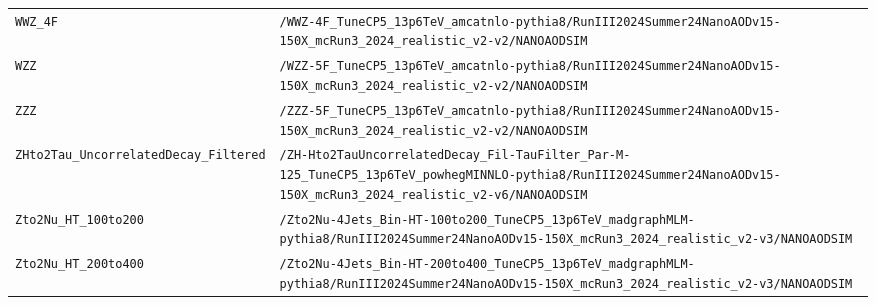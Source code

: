 \begin{longtable}{@{}>{\RaggedRight\arraybackslash}p{} >{\RaggedRight\arraybackslash}p{}@{}}
\addlinespace[2pt]
\texttt{WWZ\_\allowbreak{}4F} & \texttt{/\allowbreak{}WWZ-\allowbreak{}4F\_\allowbreak{}TuneCP5\_\allowbreak{}13p6TeV\_\allowbreak{}amcatnlo-\allowbreak{}pythia8/\allowbreak{}RunIII2024Summer24NanoAODv15-\allowbreak{}150X\_\allowbreak{}mcRun3\_\allowbreak{}2024\_\allowbreak{}realistic\_\allowbreak{}v2-\allowbreak{}v2/\allowbreak{}NANOAODSIM} \\
\addlinespace[2pt]
\texttt{WZZ} & \texttt{/\allowbreak{}WZZ-\allowbreak{}5F\_\allowbreak{}TuneCP5\_\allowbreak{}13p6TeV\_\allowbreak{}amcatnlo-\allowbreak{}pythia8/\allowbreak{}RunIII2024Summer24NanoAODv15-\allowbreak{}150X\_\allowbreak{}mcRun3\_\allowbreak{}2024\_\allowbreak{}realistic\_\allowbreak{}v2-\allowbreak{}v2/\allowbreak{}NANOAODSIM} \\
\addlinespace[2pt]
\texttt{ZZZ} & \texttt{/\allowbreak{}ZZZ-\allowbreak{}5F\_\allowbreak{}TuneCP5\_\allowbreak{}13p6TeV\_\allowbreak{}amcatnlo-\allowbreak{}pythia8/\allowbreak{}RunIII2024Summer24NanoAODv15-\allowbreak{}150X\_\allowbreak{}mcRun3\_\allowbreak{}2024\_\allowbreak{}realistic\_\allowbreak{}v2-\allowbreak{}v2/\allowbreak{}NANOAODSIM} \\
\addlinespace[2pt]
\texttt{ZHto2Tau\_\allowbreak{}UncorrelatedDecay\_\allowbreak{}Filtered} & \texttt{/\allowbreak{}ZH-\allowbreak{}Hto2TauUncorrelatedDecay\_\allowbreak{}Fil-\allowbreak{}TauFilter\_\allowbreak{}Par-\allowbreak{}M-\allowbreak{}125\_\allowbreak{}TuneCP5\_\allowbreak{}13p6TeV\_\allowbreak{}powhegMINNLO-\allowbreak{}pythia8/\allowbreak{}RunIII2024Summer24NanoAODv15-\allowbreak{}150X\_\allowbreak{}mcRun3\_\allowbreak{}2024\_\allowbreak{}realistic\_\allowbreak{}v2-\allowbreak{}v6/\allowbreak{}NANOAODSIM} \\
\addlinespace[2pt]
\texttt{Zto2Nu\_\allowbreak{}HT\_\allowbreak{}100to200} & \texttt{/\allowbreak{}Zto2Nu-\allowbreak{}4Jets\_\allowbreak{}Bin-\allowbreak{}HT-\allowbreak{}100to200\_\allowbreak{}TuneCP5\_\allowbreak{}13p6TeV\_\allowbreak{}madgraphMLM-\allowbreak{}pythia8/\allowbreak{}RunIII2024Summer24NanoAODv15-\allowbreak{}150X\_\allowbreak{}mcRun3\_\allowbreak{}2024\_\allowbreak{}realistic\_\allowbreak{}v2-\allowbreak{}v3/\allowbreak{}NANOAODSIM} \\
\addlinespace[2pt]
\texttt{Zto2Nu\_\allowbreak{}HT\_\allowbreak{}200to400} & \texttt{/\allowbreak{}Zto2Nu-\allowbreak{}4Jets\_\allowbreak{}Bin-\allowbreak{}HT-\allowbreak{}200to400\_\allowbreak{}TuneCP5\_\allowbreak{}13p6TeV\_\allowbreak{}madgraphMLM-\allowbreak{}pythia8/\allowbreak{}RunIII2024Summer24NanoAODv15-\allowbreak{}150X\_\allowbreak{}mcRun3\_\allowbreak{}2024\_\allowbreak{}realistic\_\allowbreak{}v2-\allowbreak{}v3/\allowbreak{}NANOAODSIM} \\

\end{longtable}

